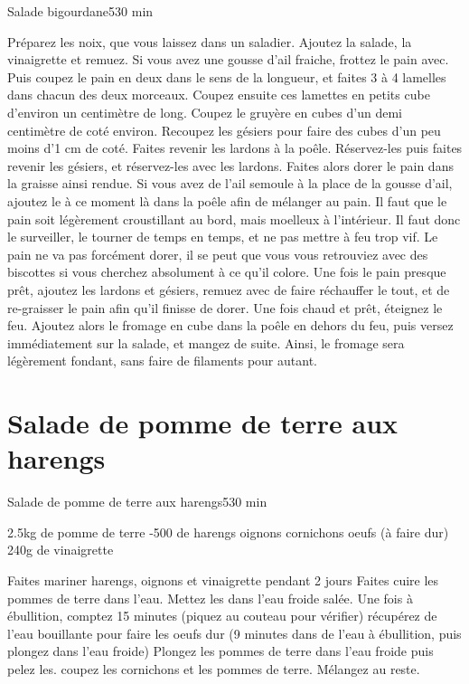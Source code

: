 {\begin{recette}{Salade bigourdane}{5}{30 min}{}
\begin{preparation}
\etape Préparez les noix, que vous laissez dans un saladier. Ajoutez la salade, la vinaigrette et remuez.
\etape Si vous avez une gousse d'ail fraiche, frottez le pain avec. Puis coupez le pain en deux dans le sens de la longueur, et 
faites 3 à 4 lamelles dans chacun des deux morceaux. Coupez ensuite ces lamettes en petits cube d'environ un centimètre de long.
\etape Coupez le gruyère en cubes d'un demi centimètre de coté environ.
\etape Recoupez les gésiers pour faire des cubes d'un peu moins d'1 cm de coté.
\etape Faites revenir les lardons à la poêle. 
\etape Réservez-les puis faites revenir les gésiers, et réservez-les avec les lardons.
\etape Faites alors dorer le pain dans la graisse ainsi rendue. Si vous avez de l'ail semoule à la place de la gousse d'ail, 
ajoutez le à ce moment là dans la poêle afin de mélanger au pain. Il faut que le pain soit légèrement croustillant au bord, mais 
moelleux à l'intérieur. Il faut donc le surveiller, le tourner de temps en temps, et ne pas mettre à feu trop vif. Le pain ne va 
pas forcément dorer, il se peut que vous vous retrouviez avec des biscottes si vous cherchez absolument à ce qu'il colore. 
\etape Une fois le pain presque prêt, ajoutez les lardons et gésiers, remuez avec de faire réchauffer le tout, et de re-graisser 
le pain afin qu'il finisse de dorer. 
\etape Une fois chaud et prêt, éteignez le feu. Ajoutez alors le fromage en cube dans la poêle en dehors du feu, puis versez 
immédiatement sur la salade, et mangez de suite. Ainsi, le fromage sera légèrement fondant, sans faire de filaments pour autant.
\end{preparation}
\end{recette}

\section{Salade de pomme de terre aux harengs}
\begin{recette}{Salade de pomme de terre aux harengs}{5}{30 min}{}
\begin{ingredients}
\ingredient 2.5kg de pomme de terre
-500 de harengs
 oignons
 cornichons
 oeufs (à faire dur)
\ingredient 240g de vinaigrette
\end{ingredients}

\begin{preparation}
\etape Faites mariner harengs, oignons et vinaigrette pendant 2 jours
\etape Faites cuire les pommes de terre dans l'eau. Mettez les dans l'eau froide salée. Une fois à ébullition, comptez 15 minutes (piquez au couteau pour vérifier)
\etape récupérez de l'eau bouillante pour faire les oeufs dur (9 minutes dans de l'eau à ébullition, puis plongez dans l'eau froide)
\etape Plongez les pommes de terre dans l'eau froide puis pelez les.
\etape coupez les cornichons et les pommes de terre. Mélangez au reste.
\end{preparation}
\end{recette}

}
